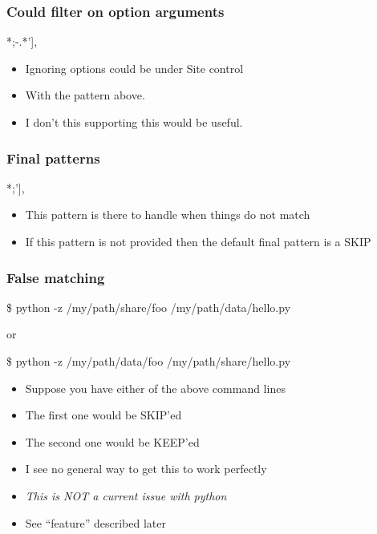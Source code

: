 \documentclass{beamer}
\begin{document}
\begin{frame}[fragile]
    \frametitle{Could filter on option arguments}
 {\tiny
    \begin{semiverbatim}
  ['CONTINUE, r'.*\\/python[0-9][^/;][^/;]*;-.*'],
    \end{semiverbatim}
}
  \begin{itemize}
    \item Ignoring options could be under Site control
    \item With the pattern above.
    \item I don't this supporting this would be useful.
  \end{itemize}
\end{frame}

\begin{frame}[fragile]
    \frametitle{Final patterns}
 {\tiny
    \begin{semiverbatim}
  ['PKGS', r'.*\\/python[0-9][^/;][^/;]*;'],
    \end{semiverbatim}
}
  \begin{itemize}
    \item This pattern is there to handle when things do not match
    \item If this pattern is not provided then the default final
      pattern is a SKIP
  \end{itemize}
\end{frame}

\begin{frame}[fragile]
    \frametitle{False matching}
 {\tiny
    \begin{semiverbatim}
\$ python -z /my/path/share/foo /my/path/data/hello.py

or

\$ python -z /my/path/data/foo /my/path/share/hello.py

    \end{semiverbatim}
}
  \begin{itemize}
    \item Suppose you have either of the above command lines
    \item The first one would be SKIP'ed
    \item The second one would be KEEP'ed
    \item I see no general way to get this to work perfectly
    \item \emph{This is NOT a current issue with python}
    \item See ``feature'' described later
  \end{itemize}

\end{frame}
\end{document}

